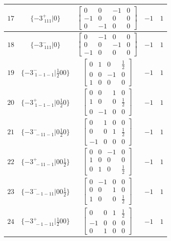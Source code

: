 \documentclass[fleqn,8pt]{jsarticle}
\begin{document}
\begin{longtable}{ccccc}
$ 17 $ & $ \{-3^{+}_{\,\,111}|0\} $ & $ \begin{bmatrix} 0 & 0 & -1 & 0 \\ -1 & 0 & 0 & 0 \\ 0 & -1 & 0 & 0 \end{bmatrix} $ & $ -1 $ & $ 1 $ \\ \hline
$ 18 $ & $ \{-3^{-}_{\,\,111}|0\} $ & $ \begin{bmatrix} 0 & -1 & 0 & 0 \\ 0 & 0 & -1 & 0 \\ -1 & 0 & 0 & 0 \end{bmatrix} $ & $ -1 $ & $ 1 $ \\ \hline
$ 19 $ & $ \{-3^{-}_{\,\,1-1-1}|\frac{1}{2} 0 0\} $ & $ \begin{bmatrix} 0 & 1 & 0 & \frac{1}{2} \\ 0 & 0 & -1 & 0 \\ 1 & 0 & 0 & 0 \end{bmatrix} $ & $ -1 $ & $ 1 $ \\ \hline
$ 20 $ & $ \{-3^{+}_{\,\,1-1-1}|0 \frac{1}{2} 0\} $ & $ \begin{bmatrix} 0 & 0 & 1 & 0 \\ 1 & 0 & 0 & \frac{1}{2} \\ 0 & -1 & 0 & 0 \end{bmatrix} $ & $ -1 $ & $ 1 $ \\ \hline
$ 21 $ & $ \{-3^{-}_{\,\,-11-1}|0 \frac{1}{2} 0\} $ & $ \begin{bmatrix} 0 & 1 & 0 & 0 \\ 0 & 0 & 1 & \frac{1}{2} \\ -1 & 0 & 0 & 0 \end{bmatrix} $ & $ -1 $ & $ 1 $ \\ \hline
$ 22 $ & $ \{-3^{+}_{\,\,-11-1}|0 0 \frac{1}{2}\} $ & $ \begin{bmatrix} 0 & 0 & -1 & 0 \\ 1 & 0 & 0 & 0 \\ 0 & 1 & 0 & \frac{1}{2} \end{bmatrix} $ & $ -1 $ & $ 1 $ \\ \hline
$ 23 $ & $ \{-3^{-}_{\,\,-1-11}|0 0 \frac{1}{2}\} $ & $ \begin{bmatrix} 0 & -1 & 0 & 0 \\ 0 & 0 & 1 & 0 \\ 1 & 0 & 0 & \frac{1}{2} \end{bmatrix} $ & $ -1 $ & $ 1 $ \\ \hline
$ 24 $ & $ \{-3^{+}_{\,\,-1-11}|\frac{1}{2} 0 0\} $ & $ \begin{bmatrix} 0 & 0 & 1 & \frac{1}{2} \\ -1 & 0 & 0 & 0 \\ 0 & 1 & 0 & 0 \end{bmatrix} $ & $ -1 $ & $ 1 $ \\ \hline

\end{longtable}
\end{document}
